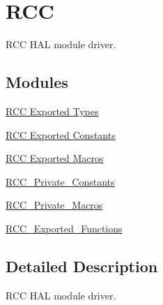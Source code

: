 \hypertarget{group___r_c_c}{}\section{R\+CC}
\label{group___r_c_c}


R\+CC H\+AL module driver.  


\subsection*{Modules}
\begin{DoxyCompactItemize}
\item 
\hyperlink{group___r_c_c___exported___types}{R\+C\+C Exported Types}
\item 
\hyperlink{group___r_c_c___exported___constants}{R\+C\+C Exported Constants}
\item 
\hyperlink{group___r_c_c___exported___macros}{R\+C\+C Exported Macros}
\item 
\hyperlink{group___r_c_c___private___constants}{R\+C\+C\+\_\+\+Private\+\_\+\+Constants}
\item 
\hyperlink{group___r_c_c___private___macros}{R\+C\+C\+\_\+\+Private\+\_\+\+Macros}
\item 
\hyperlink{group___r_c_c___exported___functions}{R\+C\+C\+\_\+\+Exported\+\_\+\+Functions}
\end{DoxyCompactItemize}


\subsection{Detailed Description}
R\+CC H\+AL module driver. 


